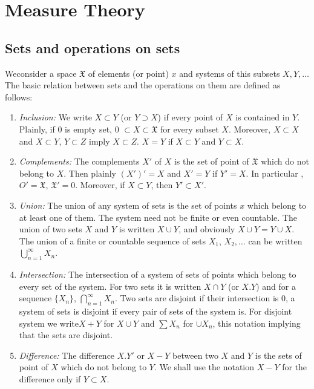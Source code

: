 \chapter{Measure Theory}\label{chap1}

\section{Sets and operations on sets}\label{chap1:sec1}

We\pageoriginale consider a space $\mathfrak{X}$ of elements (or point) $x$ and systems
of this subsets $X, Y, \ldots$ The basic relation between sets and the
operations  on them are defined as follows: 
\begin{enumerate}
  \renewcommand{\theenumi}{\alph{enumi}}
  \renewcommand{\labelenumi}{(\theenumi)}
\item \textit{Inclusion:} We write $X\subset Y$ (or $Y \supset
  X$) if every point of $X$ is contained in $Y$. Plainly, if  $0$  is empty
  set, $0$ $\subset X \subset \mathfrak{X}$ for every subset
  $X$. Moreover, $X \subset X$  and $X \subset Y$, $Y \subset Z$ imply
  $X \subset Z$. $X=Y$ if $X \subset Y$ and $Y \subset X$.

\item \textit{Complements:} The complements $X'$  of  $X$ is the
  set of point of $\mathfrak{X}$ which do not belong  to $X$. Then
  plainly $(X')'=X$ and $X' = Y$ if $Y'= X$. In particular ,
  $O'= \mathfrak{X}$, $\mathfrak{X}'=0$. Moreover, if $X \subset Y$,
  then $Y'\subset X'$.  

\item \textit{Union:} The union of any system of sets is the set
  of points $x$ which belong to at least one of them. The system need not
  be finite or even countable. The union of two sets  $X$ and  $Y$  is
  written $X\cup Y$, and obviously $X \cup Y  = Y \cup X $. The
  union of a finite or countable sequence of sets $X_1$, $X_2,\dots$ can
  be written $\displaystyle\bigcup^{\infty}_{n=1} X _n$. 


\item \textit{Intersection:} The intersection of a system of sets
  of points which belong to every set of the system. For two sets it
  is  written $X\cap Y$ (or $X.Y$) and for a sequence $\{X_n\}$,
  $\displaystyle\bigcap^{\infty}_{n=1} X_n$. Two sets are disjoint if
  their intersection is $0$, a system of sets  is disjoint if every pair
  of sets of the system is. For disjoint system we write\pageoriginale $X+Y$ for
  $X\cup Y$ and $\sum X_n$ for $\cup X_n$, this notation implying
  that the sets are disjoint.

\item \textit{Difference:} The difference $X. Y'$ or $X-Y$
  between two $X$ and $Y$  is the sets of point of $X$ which do not belong
  to $Y$. We shall use the notation $X-Y$ for the difference only if
  $Y\subset X$. 
\end{enumerate}

